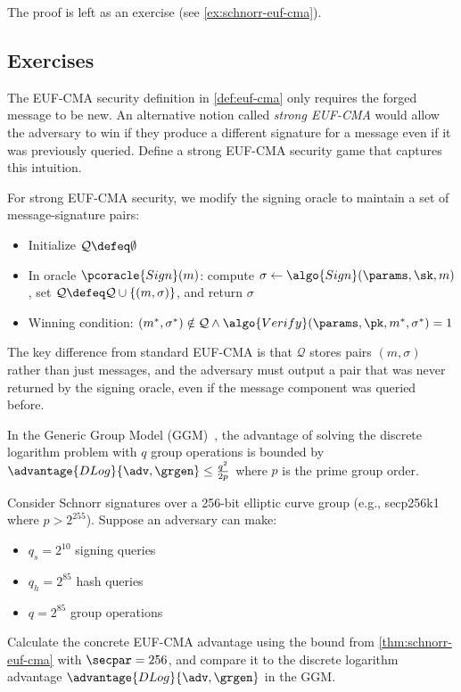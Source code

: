 The proof is left as an exercise (see \autoref{ex:schnorr-euf-cma}).

\subsection{Exercises}

\begin{exercise}
  The EUF-CMA security definition in \autoref{def:euf-cma} only requires the forged message to be new. An alternative notion called \emph{strong EUF-CMA} would allow the adversary to win if they produce a different signature for a message even if it was previously queried. Define a strong EUF-CMA security game that captures this intuition.
\end{exercise}

\ifsolutions
\begin{mysolution}
  For strong EUF-CMA security, we modify the signing oracle to maintain a set of message-signature pairs:
  \begin{itemize}
    \item Initialize $\mathcal{Q} \defeq \emptyset$
    \item In oracle $\pcoracle{Sign}(m)$: compute $\sigma \gets \algo{Sign}(\params, \sk, m)$, set $\mathcal{Q} \defeq \mathcal{Q} \cup \{(m, \sigma)\}$, and return $\sigma$
    \item Winning condition: $(m^*, \sigma^*) \notin \mathcal{Q} \wedge \algo{Verify}(\params, \pk, m^*, \sigma^*) = 1$
  \end{itemize}

  The key difference from standard EUF-CMA is that $\mathcal{Q}$ stores pairs $(m, \sigma)$ rather than just messages, and the adversary must output a pair that was never returned by the signing oracle, even if the message component was queried before.
\end{mysolution}
\fi


\begin{exercise}
  In the Generic Group Model (GGM)~\cite{EC:Shoup97}, the advantage of solving the discrete logarithm problem with $q$ group operations is bounded by $\advantage{DLog}{\adv, \grgen} \leq \frac{q^2}{2p}$ where $p$ is the prime group order.
  
  Consider Schnorr signatures over a 256-bit elliptic curve group (e.g., secp256k1 where $p > 2^{255}$). Suppose an adversary can make:
  \begin{itemize}
    \item $q_s = 2^{10}$ signing queries
    \item $q_h = 2^{85}$ hash queries
    \item $q = 2^{85}$ group operations
  \end{itemize}
  
  Calculate the concrete EUF-CMA advantage using the bound from \autoref{thm:schnorr-euf-cma} with $\secpar = 256$, and compare it to the discrete logarithm advantage $\advantage{DLog}{\adv, \grgen}$ in the GGM.
\end{exercise}

